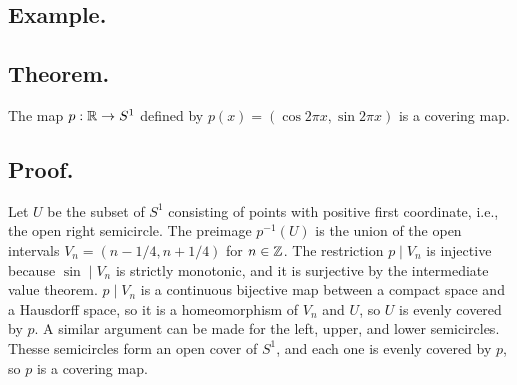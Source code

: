 \documentclass[titlepage]{article}
\begin{document}
\subsection{Example.}

\subsection{Theorem.} The map $p: \mathbb{R} \to S^{1}$ defined by $p(x) = (\cos 2\pi x, \sin 2\pi x)$ is a covering map.

\subsection{Proof.} Let $U$ be the subset of $S^{1}$ consisting of points with positive first coordinate, i.e., the open right semicircle. The preimage $p^{-1}(U)$ is the union of the open intervals $V_{n} = (n-1/4, n+1/4)$ for $n \in \mathbb{Z}$. The restriction $p \mid V_{n}$ is injective because $\sin \mid V_{n}$ is strictly monotonic, and it is surjective by the intermediate value theorem. $p \mid V_{n}$ is a continuous bijective map between a compact space and a Hausdorff space, so it is a homeomorphism of $V_{n}$ and $U$, so $U$ is evenly covered by $p$. A similar argument can be made for the left, upper, and lower semicircles. Thesse semicircles form an open cover of $S^{1}$, and each one is evenly covered by $p$, so $p$ is a covering map.
\end{document}
